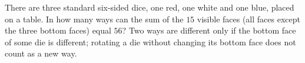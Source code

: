 There are three standard six-sided dice, one red, one white and one blue, placed on a table. In how many ways can the sum of the $15$ visible faces (all faces except the three bottom faces) equal $56$? Two ways are different only if the bottom face of some die is different; rotating a die without changing its bottom face does not count as a new way.
